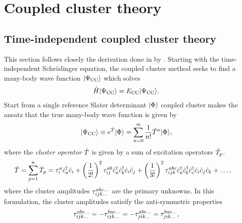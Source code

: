 \chapter{Coupled cluster theory}


    \section{Time-independent coupled cluster theory}
        This section follows closely the derivation done in
         by
        \citeauthor{crawford2000introduction} \cite{crawford2000introduction}.
        Starting with the time-independent Schrödinger equation, the coupled
        cluster method seeks to find a many-body wave function $| \Psi_{\text{CC}} \rangle$ which
        solves
        \begin{align}
            \hat{H}| \Psi_{\text{CC}} \rangle = E_{\text{CC}}| \Psi_{\text{CC}} \rangle.
        \end{align}
        Start from a single reference Slater determinant $| \Phi \rangle$ coupled
        cluster makes the ansatz that the true many-body wave function is given
        by
        \begin{align}
            | \Psi_{\text{CC}} \rangle \equiv e^{\hat{T}}| \Phi \rangle
            = \sum_{n = 0}^{\infty}\frac{1}{n!}\hat{T}^n| \Phi \rangle,
            \label{eq:cc_wave_function}
        \end{align}
        where the \emph{cluster operator} $\hat{T}$ is given by a sum of excitation
        operators $\hat{T}_{p}$.
        \begin{align}
            \hat{T} &= \sum_{p = 1}^{n} \hat{T}_p
            = \tau^a_i\hat{c}_{a}^{\dagger}\hat{c}_{i}
            + \left( \frac{1}{2!} \right)^2\tau^{ab}_{ij}\hat{c}_{a}^{\dagger}\hat{c}_{b}^{\dagger}\hat{c}_{i}\hat{c}_{j}
            + \left( \frac{1}{3!} \right)^2\tau^{abc}_{ijk}
            \hat{c}_{a}^{\dagger}\hat{c}_{b}^{\dagger}\hat{c}_{c}^{\dagger}\hat{c}_{i}\hat{c}_{j}\hat{c}_{k}
            + \dots,
        \end{align}
        where the cluster amplitudes $\tau^{abc\dots}_{ijk\dots}$ are the
        primary unknowns.
        In this formulation, the cluster amplitudes satisify the anti-symmetric
        properties
        \begin{align}
            \tau^{abc\dots}_{ijk\dots}
            = -\tau^{bac\dots}_{ijk\dots}
            = -\tau^{abc\dots}_{jik\dots}
            = \tau^{bac\dots}_{jik\dots},
        \end{align}
